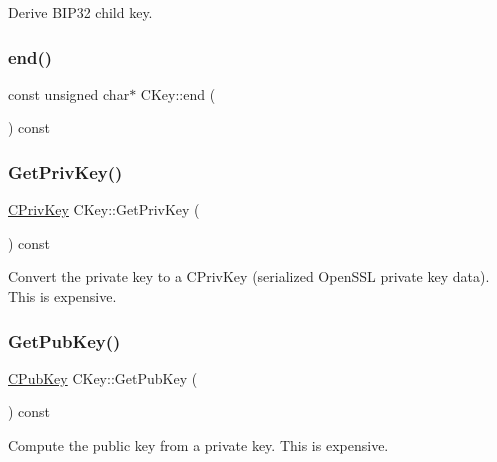 Derive B\+I\+P32 child key. 

\mbox{\label{class_c_key_a41c700c4a732672e4b7cc60d811dbf41}} 
\subsubsection{\texorpdfstring{end()}{end()}}
{\footnotesize\ttfamily const unsigned char$\ast$ C\+Key\+::end (\begin{DoxyParamCaption}{ }\end{DoxyParamCaption}) const\hspace{0.3cm}{\ttfamily [inline]}}

\mbox{\label{class_c_key_a91b6ecf71cc16e0b05ce79ec9276e729}} 
\subsubsection{\texorpdfstring{Get\+Priv\+Key()}{GetPrivKey()}}
{\footnotesize\ttfamily \mbox{\hyperlink{key_8h_a1da569b8b6e5b3fa1196cc1b877e7f54}{C\+Priv\+Key}} C\+Key\+::\+Get\+Priv\+Key (\begin{DoxyParamCaption}{ }\end{DoxyParamCaption}) const}

Convert the private key to a C\+Priv\+Key (serialized Open\+S\+SL private key data). This is expensive. \mbox{\label{class_c_key_aa1085c59603a62db6ec776300f250337}} 
\subsubsection{\texorpdfstring{Get\+Pub\+Key()}{GetPubKey()}}
{\footnotesize\ttfamily \mbox{\hyperlink{class_c_pub_key}{C\+Pub\+Key}} C\+Key\+::\+Get\+Pub\+Key (\begin{DoxyParamCaption}{ }\end{DoxyParamCaption}) const}

Compute the public key from a private key. This is expensive. \mbox{\label{class_c_key_a96b017433a65335775cf3807d73f85ce}} 
